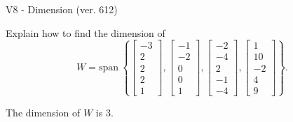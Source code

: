 \begin{exercise}
  \begin{exerciseTitle}V8 - Dimension (ver. 612)\end{exerciseTitle}
  \begin{exerciseStatement}
    Explain how to find the dimension of 
\[W=\mathrm{span}\ \left\{\left[\begin{array}{r}
-3 \\
2 \\
2 \\
2 \\
1
\end{array}\right] , \left[\begin{array}{r}
-1 \\
-2 \\
0 \\
0 \\
1
\end{array}\right] , \left[\begin{array}{r}
-2 \\
-4 \\
2 \\
-1 \\
-4
\end{array}\right] , \left[\begin{array}{r}
1 \\
10 \\
-2 \\
4 \\
9
\end{array}\right]\right\}.\]



  \end{exerciseStatement}
  \begin{exerciseAnswer}
   The dimension of \(W\) is  \(3\).
  


  \end{exerciseAnswer}
\end{exercise}